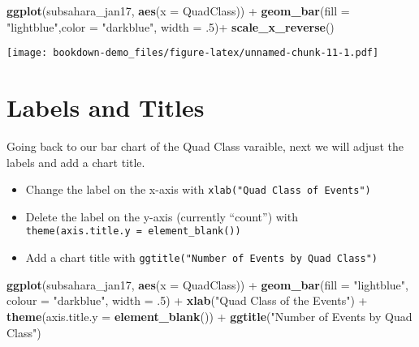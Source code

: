 \documentclass[]{book}
\newenvironment{Shaded}{\begin{snugshade}}{\end{snugshade}}
\newcommand{\KeywordTok}[1]{\textcolor[rgb]{0.13,0.29,0.53}{\textbf{{#1}}}}
\newcommand{\DataTypeTok}[1]{\textcolor[rgb]{0.13,0.29,0.53}{{#1}}}
\newcommand{\DecValTok}[1]{\textcolor[rgb]{0.00,0.00,0.81}{{#1}}}
\newcommand{\StringTok}[1]{\textcolor[rgb]{0.31,0.60,0.02}{{#1}}}
\newcommand{\NormalTok}[1]{{#1}}
\theoremstyle{definition}
\theoremstyle{definition}
\theoremstyle{remark}
\begin{document}
\begin{Shaded}
\begin{Highlighting}[]
\KeywordTok{ggplot}\NormalTok{(subsahara_jan17, }\KeywordTok{aes}\NormalTok{(}\DataTypeTok{x =} \NormalTok{QuadClass)) +}
\StringTok{  }\KeywordTok{geom_bar}\NormalTok{(}\DataTypeTok{fill =} \StringTok{"lightblue"}\NormalTok{,}\DataTypeTok{color =} \StringTok{"darkblue"}\NormalTok{, }\DataTypeTok{width =} \NormalTok{.}\DecValTok{5}\NormalTok{)+}
\StringTok{  }\KeywordTok{scale_x_reverse}\NormalTok{()}
\end{Highlighting}
\end{Shaded}

\texttt{[image: bookdown-demo\_files/figure-latex/unnamed-chunk-11-1.pdf]}

\section{Labels and Titles}\label{labels-and-titles}

Going back to our bar chart of the Quad Class varaible, next we will
adjust the labels and add a chart title.

\begin{itemize}
\item
  Change the label on the x-axis with
  \texttt{xlab("Quad\ Class\ of\ Events")}
\item
  Delete the label on the y-axis (currently ``count'') with
  \texttt{theme(axis.title.y\ =\ element\_blank())}
\item
  Add a chart title with
  \texttt{ggtitle("Number\ of\ Events\ by\ Quad\ Class")}
\end{itemize}

\begin{Shaded}
\begin{Highlighting}[]
\KeywordTok{ggplot}\NormalTok{(subsahara_jan17, }\KeywordTok{aes}\NormalTok{(}\DataTypeTok{x =} \NormalTok{QuadClass)) +}
\StringTok{  }\KeywordTok{geom_bar}\NormalTok{(}\DataTypeTok{fill =} \StringTok{"lightblue"}\NormalTok{, }\DataTypeTok{colour =} \StringTok{"darkblue"}\NormalTok{, }\DataTypeTok{width =} \NormalTok{.}\DecValTok{5}\NormalTok{) +}
\StringTok{  }\KeywordTok{xlab}\NormalTok{(}\StringTok{"Quad Class of the Events"}\NormalTok{) +}
\StringTok{  }\KeywordTok{theme}\NormalTok{(}\DataTypeTok{axis.title.y =} \KeywordTok{element_blank}\NormalTok{()) +}
\StringTok{  }\KeywordTok{ggtitle}\NormalTok{(}\StringTok{"Number of Events by Quad Class"}\NormalTok{)}
\end{Highlighting}
\end{Shaded}
\end{document}
